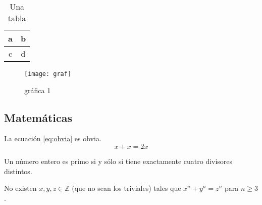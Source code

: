  
\begin{table}[ht]
	\centering
	\caption{Una tabla}
	\label{tab:una-tablita}
		\begin{tabular}{|c|c|}
			\hline
			a & b \\
			\hline
			c & d \\
			\hline
		\end{tabular}
\end{table}



\begin{figure}[htp]
	\centering
		\texttt{[image: graf]}
	\caption{gráfica 1}
	\label{fig:uanl}
\end{figure}

\subsection{Matemáticas}



La ecuación \eqref{eq:obvia} es obvia.
\begin{equation}
	x + x = 2x
	\label{eq:obvia}
\end{equation}



\begin{definicion}
	Un número entero es primo si y sólo si tiene exactamente cuatro divisores distintos.
\end{definicion}



\begin{teorema}[Fermat]
	No existen $x,y,z \in \mathbb{Z}$ (que no sean los triviales) tales que $x^n + y^n = z^n$ para $n \geq 3$.
\end{teorema}
